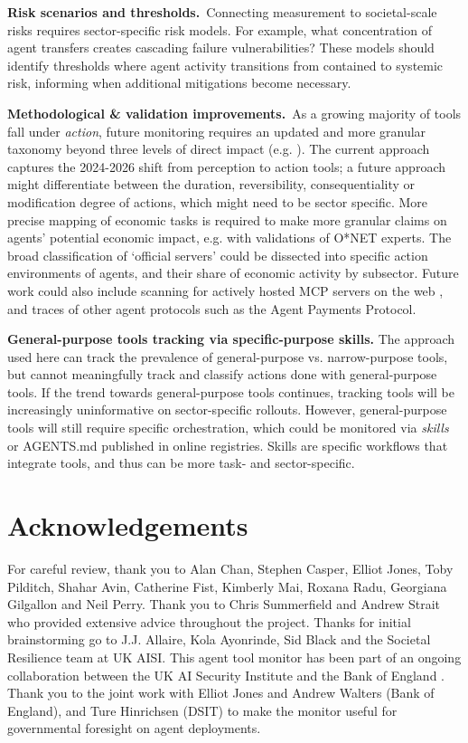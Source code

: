 \documentclass[manuscript,screen,nonacm,oneside]{acmart}
\begin{document}
\textbf{Risk scenarios and thresholds.}~Connecting measurement to societal-scale risks requires sector-specific risk models. For example, what concentration of agent transfers creates cascading failure vulnerabilities? These models should identify thresholds where agent activity transitions from contained to systemic risk, informing when additional mitigations become necessary.

\textbf{Methodological \& validation improvements.}~As a growing majority of tools fall under \emph{action}, future monitoring requires an updated and more granular taxonomy beyond three levels of direct impact (e.g. \citealt{kasirzadeh2025characterizing}). The current approach captures the 2024-2026 shift from perception to action tools; a future approach might differentiate between the duration, reversibility, consequentiality or modification degree of actions, which might need to be sector specific. More precise mapping of economic tasks is required to make more granular claims on agents' potential economic impact, e.g. with validations of O*NET experts. The broad classification of `official servers' could be dissected into specific action environments of agents, and their share of economic activity by subsector. Future work could also include scanning for actively hosted MCP servers on the web \citep{knosticFindServer}, and traces of other agent protocols such as the Agent Payments Protocol.

\textbf{General-purpose tools tracking via specific-purpose skills.} The approach used here can track the prevalence of general-purpose vs. narrow-purpose tools, but cannot meaningfully track and classify actions done with general-purpose tools. If the trend towards general-purpose tools continues, tracking tools will be increasingly uninformative on sector-specific rollouts. However, general-purpose tools will still require specific orchestration, which could be monitored via \emph{skills} or AGENTS.md \citep{agentsAGENTSmd} published in online registries. Skills are specific workflows that integrate tools, and thus can be more task- and sector-specific.

\section*{Acknowledgements}

For careful review, thank you to Alan Chan, Stephen Casper, Elliot Jones, Toby Pilditch, Shahar Avin, Catherine Fist, Kimberly Mai, Roxana Radu, Georgiana Gilgallon and Neil Perry. Thank you to Chris Summerfield and Andrew Strait who provided extensive advice throughout the project. Thanks for initial brainstorming go to J.J. Allaire, Kola Ayonrinde, Sid Black and the Societal Resilience team at UK AISI. This agent tool monitor has been part of an ongoing collaboration between the UK AI Security Institute and the Bank of England \citep{bankofenglandBankEnglands}. Thank you to the joint work with Elliot Jones and Andrew Walters (Bank of England), and Ture Hinrichsen (DSIT) to make the monitor useful for governmental foresight on agent deployments.
\end{document}

